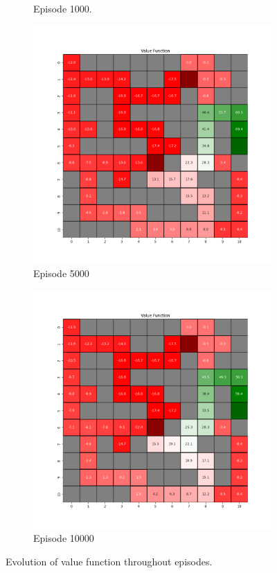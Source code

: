 \documentclass{assignment}
\begin{document}
\begin{figure}[H]
\begin{subfigure}{0.3\textwidth}
    \caption{Episode 1000.}
    \end{subfigure}\hfill
    \begin{subfigure}{0.3\textwidth}
        \includegraphics[width=\textwidth]{figures/value_q/epsilon_sweep/value_function_alpha_0.1_gamma_0.95_epsilon_0.0_iteration_5000.png}
    \caption{Episode 5000}
    \end{subfigure}\hfill
    \begin{subfigure}{0.3\textwidth}
        \includegraphics[width=\textwidth]{figures/value_q/epsilon_sweep/value_function_alpha_0.1_gamma_0.95_epsilon_0.0_iteration_10000.png}
    \caption{Episode 10000}
    \end{subfigure}
    \caption{Evolution of value function throughout episodes.}
    \label{fig:epsilon_0.0_q_learning_value}
\end{figure}
\end{document}
